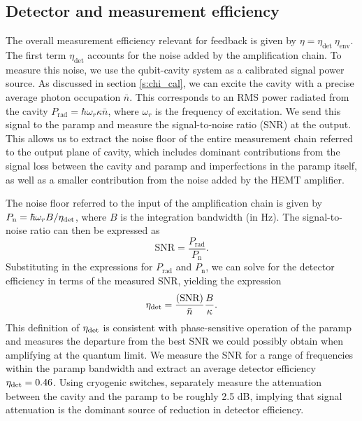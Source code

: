 \subsection{Detector and measurement efficiency}\label{s:det_meas_eta}


The overall measurement efficiency relevant for feedback is given by $\eta = \eta_{\mathrm{det}} \ \eta_{\mathrm{env}}$. The first term $\eta_{\mathrm{det}}$ accounts for the noise added by the amplification chain. To measure this noise, we use the qubit-cavity system as a calibrated signal power source. As discussed in section \ref{s:chi_cal}, we can excite the cavity with a precise average photon occupation $\bar{n}$. This corresponds to an RMS power radiated from the cavity $P_{\mathrm{rad}}= \hbar\omega_{r} \kappa \bar{n}$, where $\omega_{r}$ is the frequency of excitation. We send this signal to the paramp and measure the signal-to-noise ratio (SNR) at the output. This allows us to extract the noise floor of the entire measurement chain referred to the output plane of cavity, which includes dominant contributions from the signal loss between the cavity and paramp and imperfections in the paramp itself, as well as a smaller contribution from the noise added by the HEMT amplifier. 

The noise floor referred to the input of the amplification chain is given by $P_{\rm n} = \hbar \omega_{r}B/\eta_{\rm det}$, where $B$ is the integration bandwidth (in Hz).  The signal-to-noise ratio can then be expressed as
\begin{equation}
\mathrm{SNR}=\frac{P_\mathrm{rad}}{P_\mathrm{n}}.
\end{equation}
Substituting in the expressions for $P_\mathrm{rad}$ and $P_\mathrm{n}$, we can solve for the detector efficiency in terms of the measured SNR, yielding the expression
\begin{equation}
\eta_{\rm det}=\frac{{\rm (SNR)}}{   \bar{n}} \frac{B }{ \kappa}.
\end{equation}
This definition of $\eta_{\rm det}$ is consistent with phase-sensitive operation of the paramp and measures the departure from the best SNR we could possibly obtain when amplifying at the quantum limit. We measure the SNR for a range of frequencies within the paramp bandwidth and extract an average detector efficiency $\eta_{\rm det}=0.46$.  Using cryogenic switches, separately measure the attenuation between the cavity and the paramp to be roughly 2.5 dB, implying that signal attenuation is the dominant source of reduction in detector efficiency.

